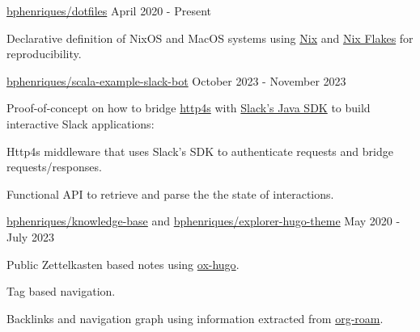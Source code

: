 
\begin{cventries}
  \openSourceEntry
    {\href{https://github.com/bphenriques/dotfiles}{bphenriques/dotfiles}}
    {April 2020 - Present}
    {
    \begin{openSourceDescription}
    Declarative definition of NixOS and MacOS systems using \href{https://nixos.org/}{Nix} and \href{https://nixos.wiki/wiki/Flakes}{Nix Flakes} for reproducibility.
    \end{openSourceDescription}
    \vspace{4mm}
    }

  \vspace{2mm}

\openSourceEntry
    {\href{https://github.com/bphenriques/scala-example-slack-bot}{bphenriques/scala-example-slack-bot}}
    {October 2023 - November 2023}
    {   
    \begin{openSourceDescription}
    Proof-of-concept on how to bridge \href{https://github.com/http4s/http4s}{http4s} with \href{https://github.com/slackapi/java-slack-sdk}{Slack's Java SDK} to build interactive Slack applications:
    \end{openSourceDescription}
    \vspace{8mm}
    \begin{openSourceItems}
        \item Http4s middleware that uses Slack's SDK to authenticate requests and bridge requests/responses.
        \item Functional API to retrieve and parse the the state of interactions.
    \end{openSourceItems}
    \vspace{4mm}
    }

  \vspace{2mm}  

  \openSourceEntry
    {\href{https://github.com/bphenriques/knowledge-base}{bphenriques/knowledge-base} and \href{https://github.com/bphenriques/explorer-hugo-theme}{bphenriques/explorer-hugo-theme}}
    {May 2020 - July 2023}
    {    
    \begin{openSourceItems}
        \item Public Zettelkasten based notes using \href{https://ox-hugo.scripter.co/}{ox-hugo}.
        \item Tag based navigation.
        \item Backlinks and navigation graph using information extracted from \href{https://www.orgroam.com/}{org-roam}.
    \end{openSourceItems}
    \vspace{4mm}
    }


\end{cventries}
